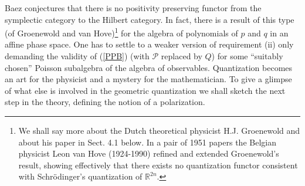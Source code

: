\documentclass[12pt]{article}
\begin{document}
Baez \cite{B06} conjectures that there is no positivity preserving functor from the symplectic category to
the Hilbert category. In fact, there is a result of this type (of Groenewold and van Hove)\footnote{We shall say more about the Dutch
theoretical physicist H.J. Groenewold and about his paper \cite{G46} in Sect. 4.1 below. In a pair of 1951 papers
the Belgian physicist Leon van Hove (1924-1990) refined and extended Groenewold's result, showing effectively
that there exists no quantization functor consistent with Schr\"odinger's quantization of ${\mathbb R}^{2n}$.}
for the algebra of polynomials of $p$ and $q$ in an  affine phase space. One has to 
settle to a weaker version of requirement (ii) only demanding the validity of 
(\ref{PPB}) (with $\mathcal{P}$ replaced by $Q$) for some ``suitably chosen'' 
Poisson subalgebra of the algebra of observables. Quantization becomes an art 
for the physicist and a mystery for the mathematician. To give a glimpse of 
what else is involved in the geometric quantization we shall sketch 
the next step in the theory, defining the notion of a polarization.
\end{document}
